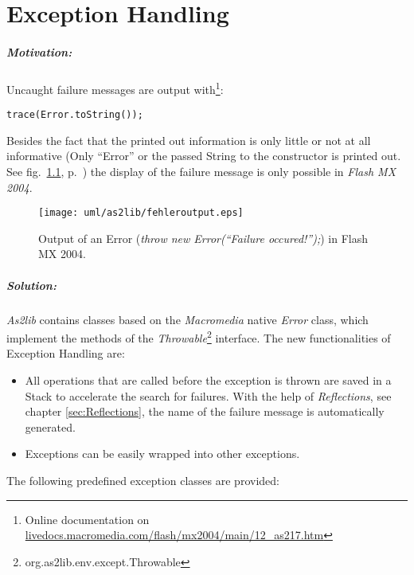 \chapter{Exception Handling}
\label{sec:ExceptionHandling}

\paragraph{Motivation:}
Uncaught failure messages are output with\footnote{Online documentation on \href{http://livedocs.macromedia.com/flash/mx2004/main/12_as217.htm}{livedocs.macromedia.com/flash/mx2004/main/12\_as217.htm}}:
\begin{lstlisting}[frame=single]
trace(Error.toString());
\end{lstlisting}
Besides the fact that the printed out information is only little or not at all informative (Only ``Error'' or the passed String to the constructor is printed out. See fig.\ \ref{fig:fehleroutput}, p.\ \pageref{fig:fehleroutput}) the display of the failure message is only possible in {\sl Flash MX 2004}.

\begin{figure}[!ht]
\begin{center}
\texttt{[image: uml/as2lib/fehleroutput.eps]}
\caption{Output of an Error (\emph{throw new Error(``Failure occured!'');}) in Flash MX 2004.}
\label{fig:fehleroutput}
\end{center}
\end{figure}

\paragraph{Solution:}
{\sl As2lib} contains classes based on the {\sl Macromedia} native {\sl Error} class, which implement the methods of the \emph{Throwable}\footnote{org.as2lib.env.except.Throwable} interface.
The new functionalities of Exception Handling are:

\begin{itemize}
	\item All operations that are called before the exception is thrown are saved in a Stack to accelerate the search for failures. With the help of \emph{Reflections}, see chapter \ref{sec:Reflections}, the name of the failure message is automatically generated.
	\item Exceptions can be easily wrapped into other exceptions.
\end{itemize}

The following predefined exception classes are provided:

